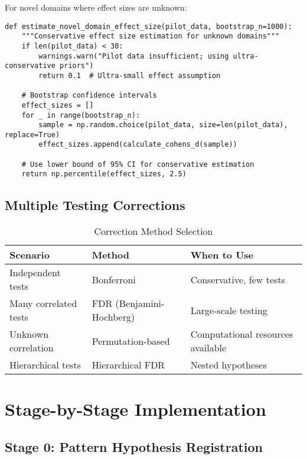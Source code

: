 \documentclass[12pt,oneside]{memoir}
\theoremstyle{plain}
\theoremstyle{definition}
\theoremstyle{remark}
\begin{document}
For novel domains where effect sizes are unknown:

\begin{lstlisting}[caption={Conservative Effect Size Estimation}]
def estimate_novel_domain_effect_size(pilot_data, bootstrap_n=1000):
    """Conservative effect size estimation for unknown domains"""
    if len(pilot_data) < 30:
        warnings.warn("Pilot data insufficient; using ultra-conservative priors")
        return 0.1  # Ultra-small effect assumption
    
    # Bootstrap confidence intervals
    effect_sizes = []
    for _ in range(bootstrap_n):
        sample = np.random.choice(pilot_data, size=len(pilot_data), replace=True)
        effect_sizes.append(calculate_cohens_d(sample))
    
    # Use lower bound of 95% CI for conservative estimation
    return np.percentile(effect_sizes, 2.5)
\end{lstlisting}

\section{Multiple Testing Corrections}

\begin{table}[h]
\centering
\caption{Correction Method Selection}
\begin{tabular}{lll}
\toprule
\textbf{Scenario} & \textbf{Method} & \textbf{When to Use} \\
\midrule
Independent tests & Bonferroni & Conservative, few tests \\
Many correlated tests & FDR (Benjamini-Hochberg) & Large-scale testing \\
Unknown correlation & Permutation-based & Computational resources available \\
Hierarchical tests & Hierarchical FDR & Nested hypotheses \\
\bottomrule
\end{tabular}
\end{table}

\chapter{Stage-by-Stage Implementation}

\section{Stage 0: Pattern Hypothesis Registration}
\end{document}
